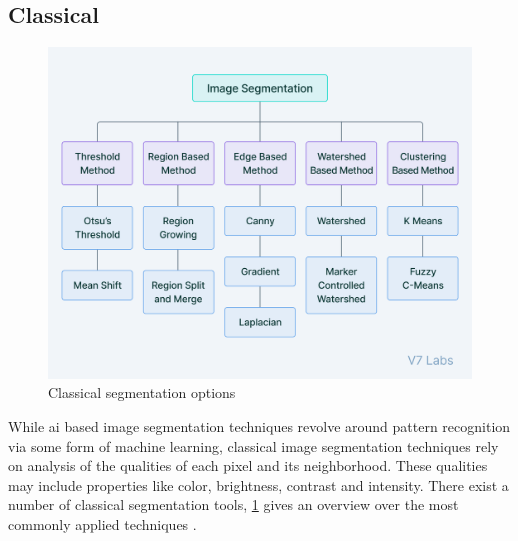 \subsection{Classical}\label{s:b-seg-techniques}
\begin{figure}[h]
	\centerline{
		\includegraphics[scale=0.5]{images/classicalSegTree.png}}
	\caption{Classical segmentation options \cite{v7labsIntroductionImageSegmentation2021}}\label{fig:classicalSegTree}
\end{figure}

\noindent
While \acrshort{ai} based image segmentation techniques revolve around pattern recognition
via some form of machine learning,
classical image segmentation techniques rely on analysis of the qualities of each pixel and its neighborhood.
These qualities may include properties like color, brightness, contrast and intensity.
There exist a number of classical segmentation tools,
\cref{fig:classicalSegTree} gives an overview over the most commonly applied techniques
\cite{yuTechniquesChallengesImage2023,baliReviewStrategiesTechniques2015}.

